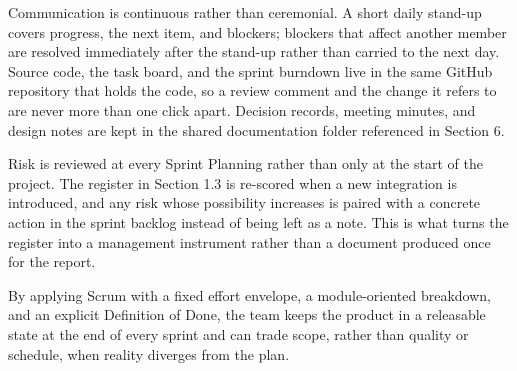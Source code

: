 Communication is continuous rather than ceremonial. A short daily stand-up covers progress, the next item, and blockers; blockers that affect another member are resolved immediately after the stand-up rather than carried to the next day. Source code, the task board, and the sprint burndown live in the same GitHub repository that holds the code, so a review comment and the change it refers to are never more than one click apart. Decision records, meeting minutes, and design notes are kept in the shared documentation folder referenced in Section 6.

Risk is reviewed at every Sprint Planning rather than only at the start of the project. The register in Section 1.3 is re-scored when a new integration is introduced, and any risk whose possibility increases is paired with a concrete action in the sprint backlog instead of being left as a note. This is what turns the register into a management instrument rather than a document produced once for the report.

By applying Scrum with a fixed effort envelope, a module-oriented breakdown, and an explicit Definition of Done, the team keeps the product in a releasable state at the end of every sprint and can trade scope, rather than quality or schedule, when reality diverges from the plan.
